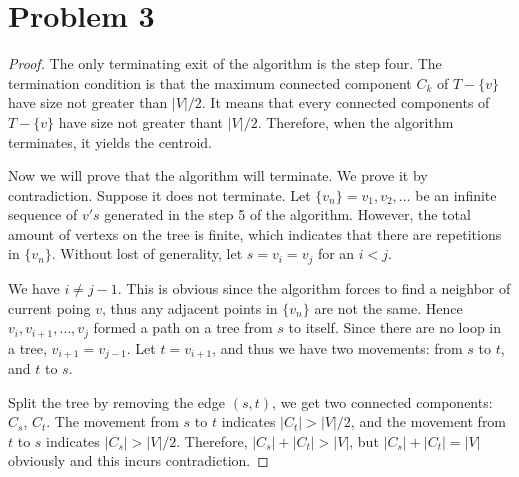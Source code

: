 \documentclass{report}
\begin{document}
    \section*{Problem 3}
    \begin{proof}
    The only terminating exit of the algorithm is the step four. The termination condition
    is that the maximum connected component $C_k$ of $T - \{v\}$ have size not greater 
    than $|V| / 2$. It means that every connected components of $T - \{v\}$ have size 
    not greater thant $|V| / 2$. Therefore, when the algorithm terminates, it yields the 
    centroid.

    Now we will prove that the algorithm will terminate. We prove it by contradiction. 
    Suppose it does not terminate. Let $\{v_n\} = v_1, v_2, \ldots$ be an infinite 
    sequence of $v's$ generated in the step 5 of the algorithm. However, the total 
    amount of vertexs on the tree is finite, which indicates that there are repetitions
    in $\{v_n\}$. Without lost of generality, let $s = v_i = v_j$ for an $i < j$. 

    We have $i \neq j - 1$. This is obvious since the algorithm forces to find a neighbor 
    of current poing $v$, thus any adjacent points in $\{v_n\}$ are not the same. Hence 
    $v_i, v_{i+1}, \ldots, v_j$ formed a path on a tree from $s$ to itself. Since there 
    are no loop in a tree, $v_{i+1} = v_{j-1}$. Let $t = v_{i+1}$, and thus we have two
    movements: from $s$ to $t$, and $t$ to $s$.

    Split the tree by removing the edge $(s, t)$, we get two connected components:
    $C_s$, $C_t$. The movement from $s$ to $t$ indicates $|C_t| > |V| / 2$, and the 
    movement from $t$ to $s$ indicates $|C_s| > |V| / 2$. Therefore, $|C_s| + |C_t| > |V|$,
    but $|C_s| + |C_t| = |V|$ obviously and this incurs contradiction.
    \end{proof}
\end{document}
